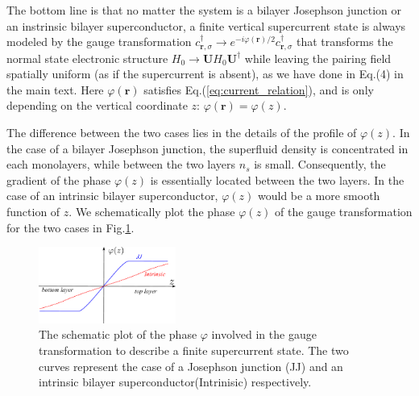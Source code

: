 \begin{subappendices}
The bottom line is that no matter the system is a bilayer Josephson junction or an instrinsic bilayer superconductor, a finite vertical supercurrent state is always modeled by the gauge transformation $c^\dagger_{\mathbf r,\sigma}\rightarrow e^{-i\varphi(\mathbf r)/2} c^\dagger_{\mathbf r,\sigma}$ that transforms the normal state electronic structure $H_0\rightarrow \mathbf U H_0 \mathbf U^\dagger$ while leaving the pairing field spatially uniform (as if the supercurrent is absent), as we have done in Eq.(4) in the main text. Here $\varphi(\mathbf r)$ satisfies Eq.(\ref{eq:current_relation}), and is only depending on the vertical coordinate $z$: $\varphi(\mathbf r)=\varphi(z)$.

The difference between the two cases lies in the details of the profile of $\varphi(z)$. In the case of a bilayer Josephson junction, the superfluid density is concentrated in each monolayers, while between the two layers $n_s$ is small. Consequently, the gradient of the phase $\varphi(z)$ is essentially located between the two layers. In the case of an intrinsic bilayer superconductor, $\varphi(z)$ would be a more smooth function of $z$. We schematically plot the phase $\varphi(z)$ of the gauge transformation for the two cases in Fig.\ref{fig:schematic_phase}.
\begin{figure}\label{fig:schematic_phase}
	\centering
    \includegraphics[width=0.4\textwidth]{contents/SATHE/figures/schematic_phase.pdf}
	\caption{The schematic plot of the phase $\varphi$ involved in the gauge transformation to describe a finite supercurrent state. The two curves represent the case of a Josephson junction (JJ) and an intrinsic bilayer superconductor(Intrinisic) respectively.}
\end{figure}


\end{subappendices}
